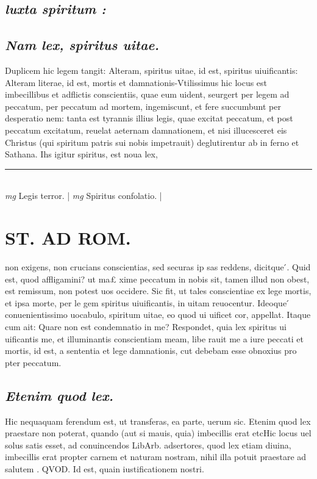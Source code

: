 \documentclass{article}
\begin{document}
\begin{pages}
\subsection*{\textit{luxta spiritum : }}
{}
\subsection*{\textit{Nam lex, spiritus uitae. }}\pstart Duplicem hic legem tangit: Alteram, spiritus uitae, id est, spiritus uiuificantis: Alteram literae, id est, mortis et damnationis-Vtilissimus hic locus est imbecillibus et adflictis conscientiis, quae eum uident, seurgert per legem ad peccatum, per peccatum ad mortem, ingemiscunt, et fere succumbunt per desperatio nem: tanta est tyrannis illius legis, quae excitat peccatum, et post peccatum excitatum, reuelat aeternam damnationem, et nisi illucesceret eis Christus (qui spiritum patris sui nobis impetrauit) deglutirentur ab in ferno et Sathana. Ihs igitur spiritus, est noua lex,  \pend
\vspace{0.5cm}\noindent
\vspace{0.2cm}\rule{1cm}{0.2pt}\\ 
\hspace{0.2cm}\textit{mg}
\footnotesize Legis terror.  
\normalsize| 
\hspace{0.2cm}\textit{mg}
\footnotesize Spiritus confolatio.  
\normalsize| 
\section*{ST. AD ROM.  }
\marginpar{[ p.82 ]}\pstart non exigens, non crucians conscientias, sed securas ip sas reddens, dicitque ́. Quid est, quod affligamini? ut ma£ xime peccatum in nobis sit, tamen illud non obest, est remissum, non potest uos occidere. Sic fit, ut tales conscientiae ex lege mortis, et ipsa morte, per le gem spiritus uiuificantis, in uitam reuocentur. Ideoque ́ conuenientissimo uocabulo, spiritum uitae, eo quod ui uificet cor, appellat. Itaque cum ait: Quare non est condemnatio in me? Respondet, quia lex spiritus ui uificantis me, et illuminantis conscientiam meam, libe rauit me a iure peccati et mortis, id est, a sententia et lege damnationis, cut debebam esse obnoxius pro pter peccatum.  \pend
{}
{}
\subsection*{\textit{Etenim quod lex. }}\pstart Hic nequaquam ferendum est, ut transferas, ea parte, uerum sic. Etenim quod lex praestare non poterat, quando (aut si mauis, quia) imbecillis erat etcHic locus uel solus satis esset, ad conuincendos LibArb. adsertores, quod lex etiam diuina, imbecillis erat propter carnem et naturam nostram, nihil illa potuit praestare ad salutem . QVOD. Id est, quain iustificationem nostri.   \pend
{}
{}

\end{pages}
\end{document}
